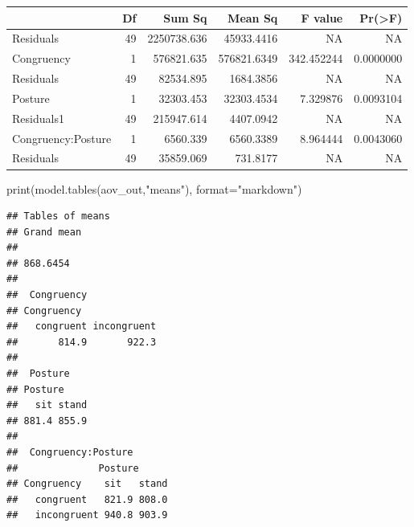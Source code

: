 \documentclass[
]{book}
\newenvironment{Shaded}{\begin{snugshade}}{\end{snugshade}}
\newcommand{\AttributeTok}[1]{\textcolor[rgb]{0.77,0.63,0.00}{#1}}
\newcommand{\CommentTok}[1]{\textcolor[rgb]{0.56,0.35,0.01}{\textit{#1}}}
\newcommand{\FunctionTok}[1]{\textcolor[rgb]{0.00,0.00,0.00}{#1}}
\newcommand{\NormalTok}[1]{#1}
\newcommand{\OtherTok}[1]{\textcolor[rgb]{0.56,0.35,0.01}{#1}}
\newcommand{\SpecialCharTok}[1]{\textcolor[rgb]{0.00,0.00,0.00}{#1}}
\newcommand{\StringTok}[1]{\textcolor[rgb]{0.31,0.60,0.02}{#1}}
\begin{document}
\begin{Shaded}
\end{Shaded}

\begin{tabular}{l|r|r|r|r|r}
\hline
  & Df & Sum Sq & Mean Sq & F value & Pr(>F)\\
\hline
Residuals & 49 & 2250738.636 & 45933.4416 & NA & NA\\
\hline
Congruency & 1 & 576821.635 & 576821.6349 & 342.452244 & 0.0000000\\
\hline
Residuals & 49 & 82534.895 & 1684.3856 & NA & NA\\
\hline
Posture & 1 & 32303.453 & 32303.4534 & 7.329876 & 0.0093104\\
\hline
Residuals1 & 49 & 215947.614 & 4407.0942 & NA & NA\\
\hline
Congruency:Posture & 1 & 6560.339 & 6560.3389 & 8.964444 & 0.0043060\\
\hline
Residuals & 49 & 35859.069 & 731.8177 & NA & NA\\
\hline
\end{tabular}

\begin{Shaded}
\begin{Highlighting}[]
\FunctionTok{print}\NormalTok{(}\FunctionTok{model.tables}\NormalTok{(aov\_out,}\StringTok{"means"}\NormalTok{), }\AttributeTok{format=}\StringTok{"markdown"}\NormalTok{)}
\end{Highlighting}
\end{Shaded}

\begin{verbatim}
## Tables of means
## Grand mean
##          
## 868.6454 
## 
##  Congruency 
## Congruency
##   congruent incongruent 
##       814.9       922.3 
## 
##  Posture 
## Posture
##   sit stand 
## 881.4 855.9 
## 
##  Congruency:Posture 
##              Posture
## Congruency    sit   stand
##   congruent   821.9 808.0
##   incongruent 940.8 903.9
\end{verbatim}
\end{document}
